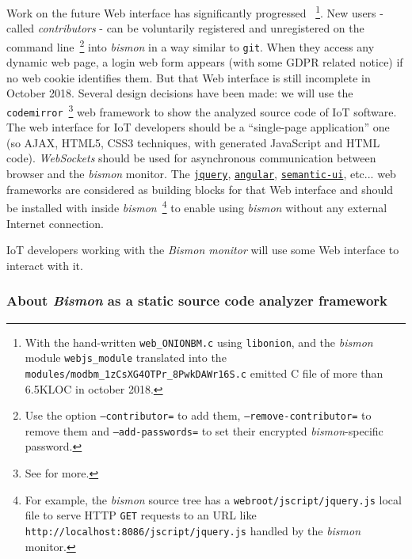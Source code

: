 Work on the future Web interface has significantly progressed
~\footnote{With the hand-written \texttt{web\_ONIONBM.c} using
  \texttt{libonion}, and the \emph{bismon} module
  \texttt{webjs\_module} translated into the
  \texttt{modules/modbm\_1zCsXG4OTPr\_8PwkDAWr16S.c} emitted C file of
  more than 6.5KLOC in october 2018.}. New users -called
\emph{contributors} - can be voluntarily registered
and unregistered on the command line~\footnote{Use the option
  \texttt{--contributor=} to add them, \texttt{--remove-contributor=}
  to remove them and \texttt{--add-passwords=} to set their encrypted
  \emph{bismon}-specific password.} into \emph{bismon} in a way
similar to \texttt{git}. When they access any dynamic web page, a
login web form appears (with some GDPR  related notice) if
no web cookie identifies them. But that Web interface is still
incomplete in October 2018. Several design decisions have been made:
we will use the \texttt{codemirror}~\footnote{See
   for more.} web framework to show the
analyzed source code of IoT software. The web interface for IoT
developers should be a ``single-page application'' one (so AJAX,
HTML5, CSS3 techniques, with generated JavaScript and HTML
code). \emph{WebSockets} should be used for asynchronous communication
between browser and the \emph{bismon} monitor. The
\href{http://jquery.com/}{\texttt{jquery}},
\href{https://angular.io/}{\texttt{angular}},
\href{https://semantic-ui.com/}{\texttt{semantic-ui}}, etc... web
frameworks are considered as building blocks for that Web interface
and should be installed with inside \emph{bismon}~\footnote{For
  example, the \emph{bismon} source tree has a
  \texttt{webroot/jscript/jquery.js} local file to serve HTTP
  \texttt{GET} requests to an URL like
  \texttt{http://localhost:8086/jscript/jquery.js} handled by the
  \emph{bismon} monitor.} to enable using \emph{bismon} without any
external Internet connection.


IoT developers working with the \emph{Bismon monitor} will use some
Web interface to interact with it.

\subsubsection{About \emph{Bismon} as a static source code analyzer framework}

